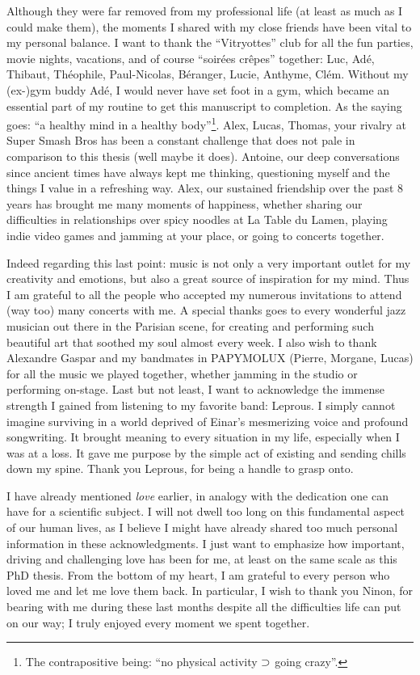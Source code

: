 Although they were far removed from my professional life (at least as much as I could make them), the moments I shared with my close friends have been vital to my personal balance. I want to thank the ``Vitryottes'' club for all the fun parties, movie nights, vacations, and of course ``soirées crêpes'' together: Luc, Adé, Thibaut, Théophile, Paul-Nicolas, Béranger, Lucie, Anthyme, Clém. Without my (ex-)gym buddy Adé, I would never have set foot in a gym, which became an essential part of my routine to get this manuscript to completion. As the saying goes: ``a healthy mind in a healthy body''\footnote{The contrapositive being: ``no physical activity $\supset$ going crazy''.}. Alex, Lucas, Thomas, your rivalry at Super Smash Bros has been a constant challenge that does not pale in comparison to this thesis (well maybe it does). Antoine, our deep conversations since ancient times have always kept me thinking, questioning myself and the things I value in a refreshing way. Alex, our sustained friendship over the past 8 years has brought me many moments of happiness, whether sharing our difficulties in relationships over spicy noodles at La Table du Lamen, playing indie video games and jamming at your place, or going to concerts together.

Indeed regarding this last point: music is not only a very important outlet for my creativity and emotions, but also a great source of inspiration for my mind. Thus I am grateful to all the people who accepted my numerous invitations to attend (way too) many concerts with me. A special thanks goes to every wonderful jazz musician out there in the Parisian scene, for creating and performing such beautiful art that soothed my soul almost every week. I also wish to thank Alexandre Gaspar and my bandmates in PAPYMOLUX (Pierre, Morgane, Lucas) for all the music we played together, whether jamming in the studio or performing on-stage. Last but not least, I want to acknowledge the immense strength I gained from listening to my favorite band: Leprous. I simply cannot imagine surviving in a world deprived of Einar's mesmerizing voice and profound songwriting. It brought meaning to every situation in my life, especially when I was at a loss. It gave me purpose by the simple act of existing and sending chills down my spine. Thank you Leprous, for being a handle to grasp onto.

I have already mentioned \emph{love} earlier, in analogy with the dedication one can have for a scientific subject. I will not dwell too long on this fundamental aspect of our human lives, as I believe I might have already shared too much personal information in these acknowledgments. I just want to emphasize how important, driving and challenging love has been for me, at least on the same scale as this PhD thesis. From the bottom of my heart, I am grateful to every person who loved me and let me love them back. In particular, I wish to thank you Ninon, for bearing with me during these last months despite all the difficulties life can put on our way; I truly enjoyed every moment we spent together.

